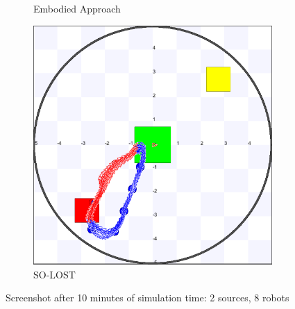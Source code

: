 \documentclass[letterpaper, 10 pt, conference]{ieeeconf}  %
\begin{document}
\begin{figure}[h]
\begin{subfigure}{.25\textwidth}
          \centering
          \caption{Embodied Approach}
     \end{subfigure}
    \centering
     \begin{subfigure}{.25\textwidth}
       \includegraphics[width=0.9\linewidth]{images/so-lost/2/raw/8.png}
          \centering
          \caption{SO-LOST}
     \end{subfigure}
   
   \centering
   \caption{Screenshot after 10 minutes of simulation time: 2 sources, 8 robots}
   \label{fig:screenshot_2_source}
\end{figure}
\end{document}
